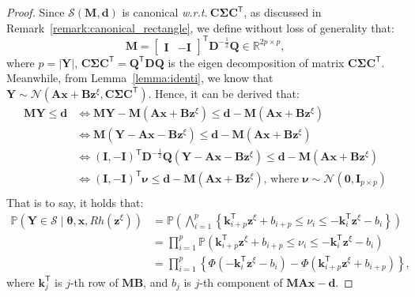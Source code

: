\documentclass{article}
\theoremstyle{plain}
\theoremstyle{definition}
\def \x {\mathbf{x}}
\def \I {\mathbf{I}}
\def \M {\mathbf{M}}
\def \A {\mathbf{A}}
\def \Y{\mathbf{Y}}
\def \wrt {\textit{w.r.t.}$\ $}
\def \x {\mathbf{x}}
\def \sS {\mathcal{S}}
\def \Q {\mathbf{Q}}
\def \Y {\mathbf{Y}}
\def \I {\mathbf{I}}
\def \k {\mathbf{k}}
\def \M {\mathbf{M}}
\def \A {\mathbf{A}}
\def \B {\mathbf{B}}
\def \C {\mathbf{C}}
\def \D {\mathbf{D}}
\def \z {\mathbf{z}}
\def \d {\mathbf{d}}
\begin{document}
\begin{proof}
Since $\sS(\M, \d)$ is canonical \wrt $\C\bm{\Sigma}\C^\mathsf{T}$, as discussed in Remark~\ref{remark:canonical_rectangle}, we define without loss of generality that:
\begin{equation*}
  \label{eq:M}
  \M = \begin{bmatrix}
    \I & -\I
  \end{bmatrix}^\mathsf{T} \D^{-\frac{1}{2}} \Q\in \mathbb{R}^{2p\times p},
\end{equation*}
where $p=|\Y|$, $\C\bm{\Sigma}\C^\mathsf{T} = \Q^\mathsf{T}\D\Q$ is the eigen decomposition of matrix $\C\bm{\Sigma}\C^\mathsf{T}$. Meanwhile, from Lemma~\ref{lemma:identi}, we know that $\Y\sim \mathcal{N}\left(\A\x+\B\z^\xi, \C\bm{\Sigma}\C^\mathsf{T}\right)$. 
Hence, it can be derived that:
\begin{equation*}
  \label{eq:region_trans}
  \begin{aligned}
    \M\Y\leq \d &\Leftrightarrow \M\Y - \M\left(\A\x+\B\z^\xi\right)\leq \d - \M\left(\A\x+\B\z^\xi\right)\\
    &\Leftrightarrow \M\left(\Y - \A\x-\B\z^\xi\right)\leq \d - \M\left(\A\x+\B\z^\xi\right)\\
    &\Leftrightarrow (\I, -\I)^\mathsf{T} \D^{-\frac{1}{2}} \Q\left(\Y - \A\x-\B\z^\xi\right)\leq \d - \M\left(\A\x+\B\z^\xi\right)\\
    &\Leftrightarrow (\I, -\I)^\mathsf{T}  \bm{\nu}\leq \d - \M\left(\A\x+\B\z^\xi\right)\text{, where $\bm{\nu}\sim\mathcal{N}(\bm{0}, \I_{p\times p})$}\\
  \end{aligned}
\end{equation*}
That is to say, it holds that:
\vskip -0.2in
\begin{equation}
  \label{eq:prob_derive}
  \begin{aligned}
  \mathbb{P}(\Y \in \sS\mid \bm{\theta}, \x, Rh(\z^\xi))
  &= \mathbb{P}\left(\mathop{\bigwedge}_{i=1}^p\left\{\k^\mathsf{T}_{i+p} \z^\xi + b_{i+p}\leq \nu_i\leq -\k_i^\mathsf{T} \z^\xi - b_i\right\}\right)\\
  &= \prod_{i=1}^p \mathbb{P}\left(\k^\mathsf{T}_{i+p} \z^\xi + b_{i+p}\leq \nu_i\leq -\k_i^\mathsf{T} \z^\xi - b_i\right)\\
  &= \prod_{i=1}^p\left\{\Phi\left(-\k_i^\mathsf{T} \z^\xi - b_i\right) - \Phi\left(\k^\mathsf{T}_{i+p} \z^\xi + b_{i+p}\right)\right\},
  \end{aligned}
\end{equation}
where $\k_j^\mathsf{T}$ is $j$-th row of $\M\B$, and $b_j$ is $j$-th component of $\M\A\x-\d$.


\end{proof}
\end{document}
